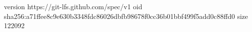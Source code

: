 version https://git-lfs.github.com/spec/v1
oid sha256:a71ffee8c9e630b3348fdc86026dbfb98678f0cc36b01bbf499f5add0c88ffd0
size 122092
